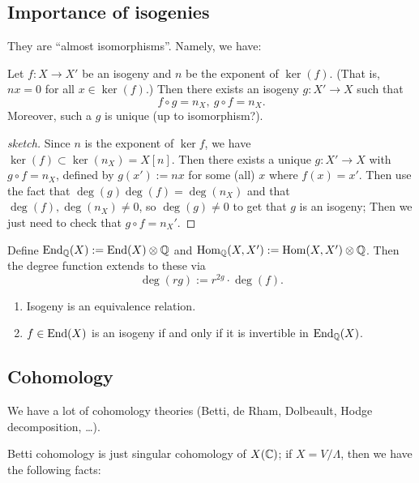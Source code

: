 \subsection{Importance of isogenies}

They are ``almost isomorphisms''. Namely, we have:

\begin{theorem}
Let $f:X\to X'$ be an isogeny and $n$ be the exponent of $\ker(f)$. (That is, $nx=0$ for all $x\in \ker(f)$.) Then there exists an isogeny $g:X'\to X$ such that 
$$f\circ g=n_X,\ g\circ f=n_X.$$
Moreover, such a $g$ is unique (up to isomorphism?).
\end{theorem}

\begin{proof}[sketch]
Since $n$ is the exponent of $\ker f$, we have $\ker(f)\subset \ker(n_X)=X[n]$. Then there exists a unique $g:X'\to X$ with $g\circ f = n_X$, defined by $g(x'):=nx$ for some (all) $x$ where $f(x)=x'$. Then use the fact that $\deg(g)\deg(f)=\deg(n_X)$ and that $\deg(f),\deg(n_X)\not= 0$, so $\deg(g)\not= 0$ to get that $g$ is an isogeny; Then we just need to check that $g\circ f = n_X'$. 
\end{proof}

Define $\operatorname{End}_{\mathbb Q}(X):=\operatorname{End}(X)\otimes {\mathbb Q}$ and $\operatorname{Hom}_{\mathbb Q}(X,X'):=\operatorname{Hom}(X,X')\otimes {\mathbb Q}$. Then the degree function extends to these via
$$\deg(rg):=r^{2g}\cdot \deg(f).$$

\begin{corollary}
\noindent
\begin{enumerate}
\item Isogeny is an equivalence relation.
\item $f\in \operatorname{End}(X)$ is an isogeny if and only if it is invertible in $\operatorname{End}_{\mathbb Q}(X)$. 
\end{enumerate}
\end{corollary}



\subsection{Cohomology} 

We have a lot of cohomology theories (Betti, de Rham, Dolbeault, Hodge decomposition, \dots).

Betti cohomology is just singular cohomology of $X({\mathbb C})$; if $X=V/\Lambda$, then we have the following facts:

